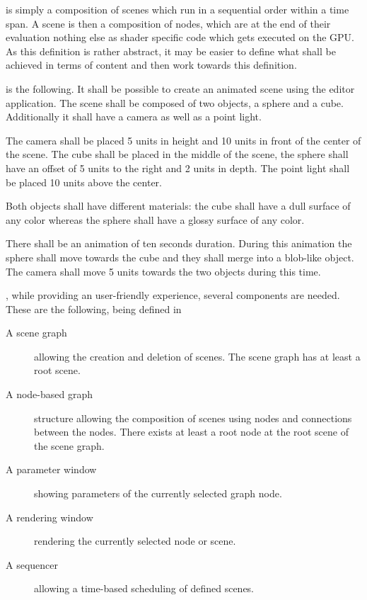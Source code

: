 \documentclass[%
    a4paper,    %
    justified,  %
    nobib,      %
    openany     %
]{tufte-book}
\begin{document}
 is simply a composition of scenes which run in a
sequential order within a time span. A scene is then a composition of nodes,
which are at the end of their evaluation nothing else as shader specific code
which gets executed on the GPU. As this definition is rather abstract, it may be
easier to define what shall be achieved in terms of content and then work
towards this definition.

 is the following.
It shall be possible to create an animated scene using the editor application.
The scene shall be composed of two objects, a sphere and a cube. Additionally it
shall have a camera as well as a point light.

The camera shall be placed 5 units in height and 10 units in front of the center
of the scene. The cube shall be placed in the middle of the scene, the sphere
shall have an offset of 5 units to the right and 2 units in depth. The point
light shall be placed 10 units above the center.

Both objects shall have different materials: the cube shall have a dull surface
of any color whereas the sphere shall have a glossy surface of any color.

There shall be an animation of ten seconds duration. During this animation the
sphere shall move towards the cube and they shall merge into a blob-like object.
The camera shall move 5 units towards the two objects during this time.


, while providing an user-friendly
experience, several components are needed. These are the following, being
defined in~~\cite{osterwalder-qde-2016}

\begin{description}
  \item[A scene graph] allowing the creation and deletion of scenes. The scene
    graph has at least a root scene.
  \item[A node-based graph] structure allowing the composition of scenes using
    nodes and connections between the nodes. There exists at least a root node
    at the root scene of the scene graph.
  \item[A parameter window] showing parameters of the currently selected graph
    node.
  \item[A rendering window] rendering the currently selected node or scene.
  \item[A sequencer] allowing a time-based scheduling of defined scenes.
\end{description}
\end{document}
